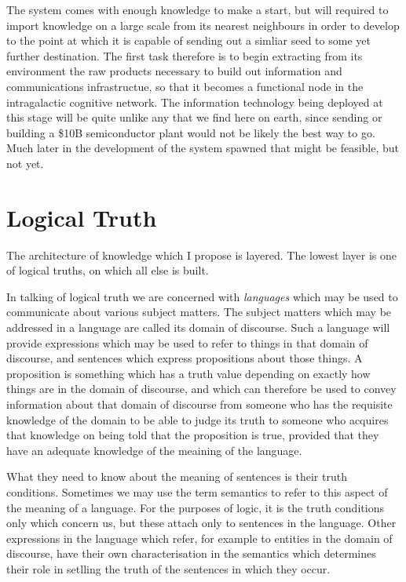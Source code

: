 \documentclass[10pt,titlepage]{article}
\begin{document}
The system comes with enough knowledge to make a start, but will required to import knowledge on a large scale from its nearest neighbours in order to develop to the point at which it is capable of sending out a simliar seed to some yet further destination.
The first task therefore is to begin extracting from its environment the raw products necessary to build out information and communications infrastructue, so that it becomes a functional node in the intragalactic cognitive network.
The information technology being deployed at this stage will be quite unlike any that we find here on earth, since sending or building a \$10B semiconductor plant would not be likely the best way to go.
Much later in the development of the system spawned that might be feasible, but not yet.

\section{Logical Truth}

The architecture of knowledge which I propose is layered.
The lowest layer is one of logical truths, on which all else is built.

In talking of logical truth we are concerned with \emph{languages} which may be used to communicate about various subject matters.
The subject matters which may be addressed in a language are called its domain of discourse.
Such a language will provide expressions which may be used to refer to things in that domain of discourse, and sentences which express propositions about those things.
A proposition is something which has a truth value depending on exactly how things are in the domain of discourse, and which can therefore be used to convey information about that domain of discourse from someone who has the requisite knowledge of the domain to be able to judge its truth to someone who acquires that knowledge on being told that the proposition is true, provided that they have an adequate knowledge of the meaining of the language.

What they need to know about the meaning of sentences is their truth conditions.
Sometimes we may use the term semantics to refer to this aspect of the meaning of a language.
For the purposes of logic, it is the truth conditions only which concern us, but these attach only to sentences in the language.
Other expressions in the language which refer, for example to entities in the domain of discourse, have their own characterisation in the semantics which determines their role in setlling the truth of the sentences in which they occur.
\end{document}
